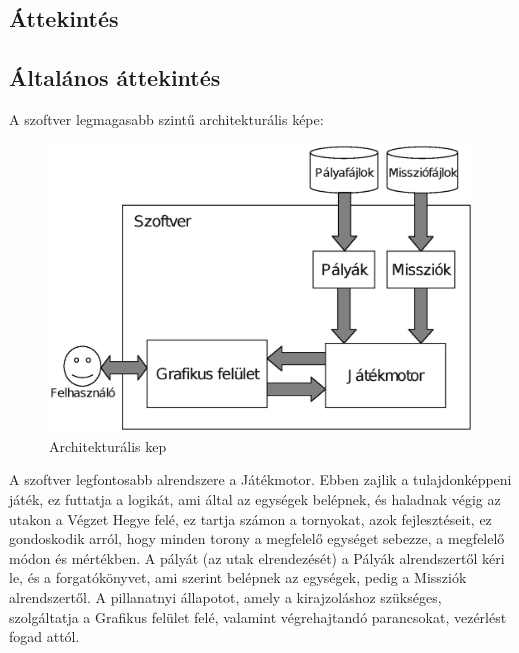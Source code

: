 \begin{nopb}
\section{Áttekintés}
\subsection{Általános áttekintés}


A szoftver legmagasabb szintű architekturális képe:
\newline
\begin{figure}[H]
\centering
\includegraphics[scale=.7]{images/arch.eps}
\caption{Architekturális kep}
\label{overflow}
\end{figure}
\end{nopb}
A szoftver legfontosabb alrendszere a Játékmotor. Ebben zajlik a tulajdonképpeni játék, ez futtatja a logikát, ami által az egységek belépnek, és haladnak végig az utakon a Végzet Hegye felé, ez tartja számon a tornyokat, azok fejlesztéseit, ez gondoskodik arról, hogy minden torony a megfelelő egységet sebezze, a megfelelő módon és mértékben. A pályát (az utak elrendezését) a Pályák alrendszertől kéri le, és a forgatókönyvet, ami szerint belépnek az egységek, pedig a Missziók alrendszertől. A pillanatnyi állapotot, amely a kirajzoláshoz szükséges, szolgáltatja a Grafikus felület felé, valamint végrehajtandó parancsokat, vezérlést fogad attól. \\ \\
